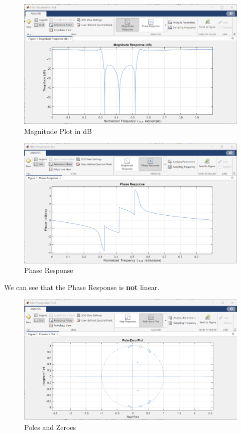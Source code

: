 \documentclass{article}
\begin{document}
\begin{figure}[h!]

\centering
\includegraphics[scale = 0.5]{Elliptic_Magnitude_BandStop.png}
\caption{Magnitude Plot in dB}
\end{figure}

\begin{figure}[h!]

\centering
\includegraphics[scale = 0.5]{Elliptic_Phase_BandStop.png}
\caption{Phase Response}
\end{figure}

We can see that the Phase Response is \textbf{not} linear.

\begin{figure}[h!]

\centering
\includegraphics[scale = 0.5]{Elliptic_Pole_Bandstop.png}
\caption{Poles and Zeroes}
\end{figure}
\end{document}
